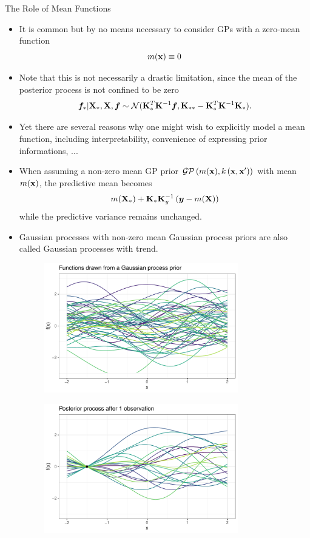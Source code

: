 \documentclass[11pt,compress,t,notes=noshow, xcolor=table]{beamer}
\begin{document}
\begin{vbframe}{The Role of Mean Functions}

\begin{itemize}
  \item It is common but by no means necessary to consider GPs with a zero-mean function 
  $$
    m(\mathbf{x}) \equiv 0
  $$
  \item Note that this is not necessarily a drastic limitation, since the mean of the posterior process is not confined to be zero 
  $$
    \bm{f}_* | \mathbf{X}_*, \mathbf{X}, \bm{f} \sim \mathcal{N}(\mathbf{K}_{*}^{T}\mathbf{K}^{-1}\bm{f}, \mathbf{K}_{**} - \mathbf{K}_*^T \mathbf{K} ^{-1}\mathbf{K}_*).
  $$
  \item Yet there are several reasons why one might wish to explicitly model a mean function, including interpretability, convenience of expressing prior informations, ... 
  \item When assuming a non-zero mean GP prior $\mathcal{GP}\left(m(\mathbf{x}), k\left(\mathbf{x}, \mathbf{x}^{\prime} \right) \right)$ with mean $m(\mathbf{x})$, the predictive mean becomes 
  $$
    m(\mathbf{X}_*) + \mathbf{K}_*\mathbf{K}_y^{-1}\left(\bm{y} - m(\mathbf{X})\right)
  $$
  while the predictive variance remains unchanged. 
  
  \framebreak
  
  \item Gaussian processes with non-zero mean Gaussian process priors are also called Gaussian processes with trend.  
\vspace{.3cm}

\begin{figure}
\includegraphics[width=0.8\textwidth]{figure/gp_sample/1_1.pdf}
\end{figure}

\framebreak


\begin{figure}
\includegraphics[width=0.8\textwidth]{figure/gp_sample/2_1.pdf}
\end{figure}


\end{itemize}
\end{vbframe}
\end{document}
